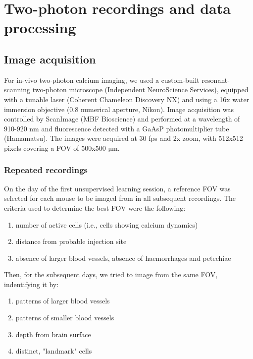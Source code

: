 \section{Two-photon recordings and data processing}

\subsection{Image acquisition}
\label{Image acquisition}
For in-vivo two-photon calcium imaging, we used a custom-built resonant-scanning two-photon microscope (Independent NeuroScience Services), equipped with a tunable laser (Coherent Chameleon Discovery NX) and using a 16x water immersion objective (0.8 numerical aperture, Nikon). Image acquisition was controlled by ScanImage (MBF Bioscience) and performed at a wavelength of 910-920 nm and fluorescence detected with a GaAsP photomultiplier tube (Hamamatsu). The images were acquired at 30 fps and 2x zoom, with 512x512 pixels covering a FOV of 500x500 µm.
\subsubsection{Repeated recordings}
On the day of the first unsupervised learning session, a reference FOV was selected for each mouse to be imaged from in all subsequent recordings. The criteria used to determine the best FOV were the following:
\begin{enumerate}
    \item number of active cells (i.e., cells showing calcium dynamics)
    \item distance from probable injection site
    \item absence of larger blood vessels, absence of haemorrhages and petechiae
\end{enumerate}
Then, for the subsequent days, we tried to image from the same FOV, indentifying it by:
\begin{enumerate}
    \item patterns of larger blood vessels
    \item patterns of smaller blood vessels
    \item depth from brain surface
    \item distinct, "landmark" cells
\end{enumerate}
